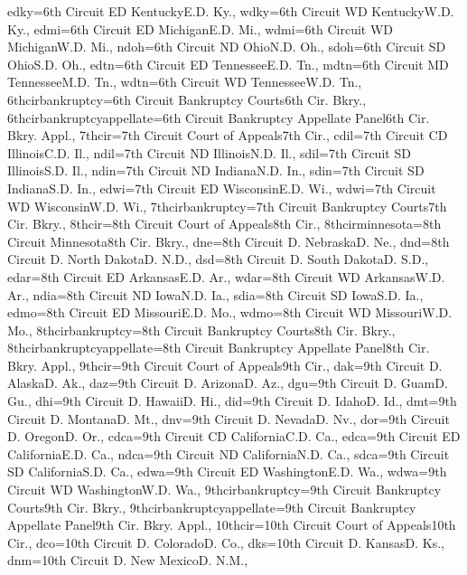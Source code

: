 {edky={{6th Circuit ED Kentucky}{E.D. Ky.}},
wdky={{6th Circuit WD Kentucky}{W.D. Ky.}},
edmi={{6th Circuit ED Michigan}{E.D. Mi.}},
wdmi={{6th Circuit WD Michigan}{W.D. Mi.}},
ndoh={{6th Circuit ND Ohio}{N.D. Oh.}},
sdoh={{6th Circuit SD Ohio}{S.D. Oh.}},
edtn={{6th Circuit ED Tennessee}{E.D. Tn.}},
mdtn={{6th Circuit MD Tennessee}{M.D. Tn.}},
wdtn={{6th Circuit WD Tennessee}{W.D. Tn.}},
6thcirbankruptcy={{6th Circuit Bankruptcy Courts}{6th Cir. Bkry.}},
6thcirbankruptcyappellate={{6th Circuit Bankruptcy Appellate Panel}{6th Cir. Bkry. Appl.}},
7thcir={{7th Circuit Court of Appeals}{7th Cir.}},
cdil={{7th Circuit CD Illinois}{C.D. Il.}},
ndil={{7th Circuit ND Illinois}{N.D. Il.}},
sdil={{7th Circuit SD Illinois}{S.D. Il.}},
ndin={{7th Circuit ND Indiana}{N.D. In.}},
sdin={{7th Circuit SD Indiana}{S.D. In.}},
edwi={{7th Circuit ED Wisconsin}{E.D. Wi.}},
wdwi={{7th Circuit WD Wisconsin}{W.D. Wi.}},
7thcirbankruptcy={{7th Circuit Bankruptcy Courts}{7th Cir. Bkry.}},
8thcir={{8th Circuit Court of Appeals}{8th Cir.}},
8thcirminnesota={{8th Circuit Minnesota}{8th Cir. Bkry.}},
dne={{8th Circuit D. Nebraska}{D. Ne.}},
dnd={{8th Circuit D. North Dakota}{D. N.D.}},
dsd={{8th Circuit D. South Dakota}{D. S.D.}},
edar={{8th Circuit ED Arkansas}{E.D. Ar.}},
wdar={{8th Circuit WD Arkansas}{W.D. Ar.}},
ndia={{8th Circuit ND Iowa}{N.D. Ia.}},
sdia={{8th Circuit SD Iowa}{S.D. Ia.}},
edmo={{8th Circuit ED Missouri}{E.D. Mo.}},
wdmo={{8th Circuit WD Missouri}{W.D. Mo.}},
8thcirbankruptcy={{8th Circuit Bankruptcy Courts}{8th Cir. Bkry.}},
8thcirbankruptcyappellate={{8th Circuit Bankruptcy Appellate Panel}{8th Cir. Bkry. Appl.}},
9thcir={{9th Circuit Court of Appeals}{9th Cir.}},
dak={{9th Circuit D. Alaska}{D. Ak.}},
daz={{9th Circuit D. Arizona}{D. Az.}},
dgu={{9th Circuit D. Guam}{D. Gu.}},
dhi={{9th Circuit D. Hawaii}{D. Hi.}},
did={{9th Circuit D. Idaho}{D. Id.}},
dmt={{9th Circuit D. Montana}{D. Mt.}},
dnv={{9th Circuit D. Nevada}{D. Nv.}},
dor={{9th Circuit D. Oregon}{D. Or.}},
cdca={{9th Circuit CD California}{C.D. Ca.}},
edca={{9th Circuit ED California}{E.D. Ca.}},
ndca={{9th Circuit ND California}{N.D. Ca.}},
sdca={{9th Circuit SD California}{S.D. Ca.}},
edwa={{9th Circuit ED Washington}{E.D. Wa.}},
wdwa={{9th Circuit WD Washington}{W.D. Wa.}},
9thcirbankruptcy={{9th Circuit Bankruptcy Courts}{9th Cir. Bkry.}},
9thcirbankruptcyappellate={{9th Circuit Bankruptcy Appellate Panel}{9th Cir. Bkry. Appl.}},
10thcir={{10th Circuit Court of Appeals}{10th Cir.}},
dco={{10th Circuit D. Colorado}{D. Co.}},
dks={{10th Circuit D. Kansas}{D. Ks.}},
dnm={{10th Circuit D. New Mexico}{D. N.M.}},
}
